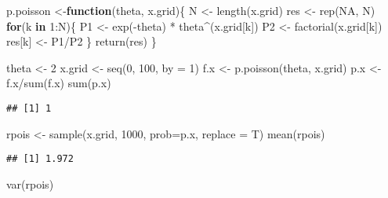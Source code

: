 \documentclass[
  12pt,
  spanish,
]{book}
\newenvironment{Shaded}{\begin{snugshade}}{\end{snugshade}}
\newcommand{\AttributeTok}[1]{\textcolor[rgb]{0.77,0.63,0.00}{#1}}
\newcommand{\ConstantTok}[1]{\textcolor[rgb]{0.00,0.00,0.00}{#1}}
\newcommand{\ControlFlowTok}[1]{\textcolor[rgb]{0.13,0.29,0.53}{\textbf{#1}}}
\newcommand{\DecValTok}[1]{\textcolor[rgb]{0.00,0.00,0.81}{#1}}
\newcommand{\FunctionTok}[1]{\textcolor[rgb]{0.00,0.00,0.00}{#1}}
\newcommand{\NormalTok}[1]{#1}
\newcommand{\OtherTok}[1]{\textcolor[rgb]{0.56,0.35,0.01}{#1}}
\newcommand{\SpecialCharTok}[1]{\textcolor[rgb]{0.00,0.00,0.00}{#1}}
\theoremstyle{definition}
\theoremstyle{definition}
\theoremstyle{definition}
\theoremstyle{definition}
\theoremstyle{remark}
\begin{document}
\begin{Shaded}
\begin{Highlighting}[]
\NormalTok{p.poisson }\OtherTok{\textless{}{-}}\ControlFlowTok{function}\NormalTok{(theta, x.grid)\{}
\NormalTok{  N }\OtherTok{\textless{}{-}} \FunctionTok{length}\NormalTok{(x.grid)}
\NormalTok{  res }\OtherTok{\textless{}{-}} \FunctionTok{rep}\NormalTok{(}\ConstantTok{NA}\NormalTok{, N)}
  \ControlFlowTok{for}\NormalTok{(k }\ControlFlowTok{in} \DecValTok{1}\SpecialCharTok{:}\NormalTok{N)\{}
\NormalTok{    P1 }\OtherTok{\textless{}{-}} \FunctionTok{exp}\NormalTok{(}\SpecialCharTok{{-}}\NormalTok{theta) }\SpecialCharTok{*}\NormalTok{ theta}\SpecialCharTok{\^{}}\NormalTok{(x.grid[k])}
\NormalTok{    P2 }\OtherTok{\textless{}{-}} \FunctionTok{factorial}\NormalTok{(x.grid[k])}
\NormalTok{    res[k] }\OtherTok{\textless{}{-}}\NormalTok{ P1}\SpecialCharTok{/}\NormalTok{P2}
\NormalTok{  \}}
  \FunctionTok{return}\NormalTok{(res)}
\NormalTok{\}}

\NormalTok{theta }\OtherTok{\textless{}{-}} \DecValTok{2}
\NormalTok{x.grid }\OtherTok{\textless{}{-}} \FunctionTok{seq}\NormalTok{(}\DecValTok{0}\NormalTok{, }\DecValTok{100}\NormalTok{, }\AttributeTok{by =} \DecValTok{1}\NormalTok{)}
\NormalTok{f.x }\OtherTok{\textless{}{-}} \FunctionTok{p.poisson}\NormalTok{(theta, x.grid)}
\NormalTok{p.x }\OtherTok{\textless{}{-}}\NormalTok{ f.x}\SpecialCharTok{/}\FunctionTok{sum}\NormalTok{(f.x)}
\FunctionTok{sum}\NormalTok{(p.x)}
\end{Highlighting}
\end{Shaded}

\begin{verbatim}
## [1] 1
\end{verbatim}

\begin{Shaded}
\begin{Highlighting}[]
\NormalTok{rpois }\OtherTok{\textless{}{-}} \FunctionTok{sample}\NormalTok{(x.grid, }\DecValTok{1000}\NormalTok{, }\AttributeTok{prob=}\NormalTok{p.x, }\AttributeTok{replace =}\NormalTok{ T)}
\FunctionTok{mean}\NormalTok{(rpois)}
\end{Highlighting}
\end{Shaded}

\begin{verbatim}
## [1] 1.972
\end{verbatim}

\begin{Shaded}
\begin{Highlighting}[]
\FunctionTok{var}\NormalTok{(rpois)}
\end{Highlighting}
\end{Shaded}
\end{document}
